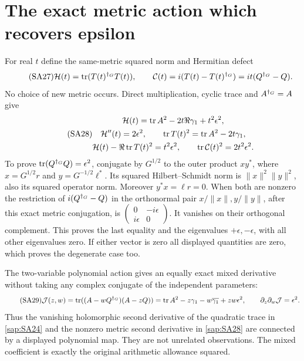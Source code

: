 \section{The exact metric action which recovers epsilon}

For real $t$ define the same-metric squared norm and
Hermitian defect
\begin{equation}\tag{SA27}\label{sap:SA27}
\mathcal H(t)=\operatorname{tr}(T(t)^{\dagger_G}T(t)),\qquad
\mathcal C(t)=i(T(t)-T(t)^{\dagger_G})
=it(Q^{\dagger_G}-Q).
\end{equation}
No choice of new metric occurs. Direct multiplication,
cyclic trace and $A^{\dagger_G}=A$ give
\begin{equation}\tag{SA28}\label{sap:SA28}
\begin{gathered}
\mathcal H(t)=\operatorname{tr} A^2-2t\Re\gamma_1+t^2\epsilon^2,\\
\mathcal H''(t)=2\epsilon^2,\qquad
\operatorname{tr} T(t)^2=\operatorname{tr} A^2-2t\gamma_1,\\
\mathcal H(t)-\Re\operatorname{tr} T(t)^2=t^2\epsilon^2,\qquad
\operatorname{tr}\mathcal C(t)^2=2t^2\epsilon^2.
\end{gathered}
\end{equation}
To prove $\operatorname{tr}(Q^{\dagger_G}Q)=\epsilon^2$, conjugate by
$G^{1/2}$ to the outer product
$xy^*$, where $x=G^{1/2}r$ and
$y=G^{-1/2}\ell^*$. Its squared Hilbert--Schmidt norm is
$\|x\|^2\|y\|^2$, also its squared operator norm.
Moreover $y^*x=\ell r=0$.
When both are nonzero the restriction of
$i(Q^{\dagger_G}-Q)$ in the orthonormal pair
$x/\|x\|,y/\|y\|$, after this exact metric conjugation,
is
$\left(\begin{smallmatrix}0&-i\epsilon\\
i\epsilon&0\end{smallmatrix}\right)$.
It vanishes on their orthogonal complement. This proves
the last equality and the eigenvalues
$+\epsilon,-\epsilon$, with all other eigenvalues zero.
If either vector is zero all displayed quantities are
zero, which proves the degenerate case too.

The two-variable polynomial action gives an equally exact
mixed derivative without taking any complex conjugate of
the independent parameters:
\begin{equation}\tag{SA29}\label{sap:SA29}
\mathcal J(z,w)=\operatorname{tr}((A-wQ^{\dagger_G})(A-zQ))
=\operatorname{tr} A^2-z\gamma_1-w\overline{\gamma_1}+zw\epsilon^2,
\qquad \partial_z\partial_w\mathcal J=\epsilon^2 .
\end{equation}
Thus the vanishing holomorphic second derivative of the
quadratic trace in \eqref{sap:SA24} and the nonzero metric
second derivative in \eqref{sap:SA28} are connected by a
displayed polynomial map. They are not unrelated
observations. The mixed coefficient is exactly the
original arithmetic allowance squared.

